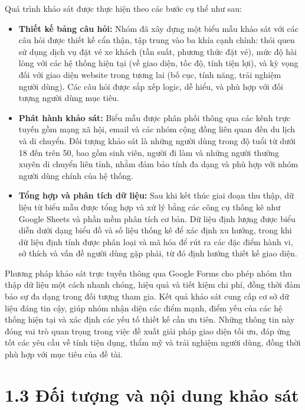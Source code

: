 Quá trình khảo sát được thực hiện theo các bước cụ thể như sau:
\begin{itemize}
    \item \textbf{Thiết kế bảng câu hỏi:} Nhóm đã xây dựng một biểu mẫu khảo sát với các câu hỏi được thiết kế cẩn thận, tập trung vào ba khía cạnh chính: thói quen sử dụng dịch vụ đặt vé xe khách (tần suất, phương thức đặt vé), mức độ hài lòng với các hệ thống hiện tại (về giao diện, tốc độ, tính tiện lợi), và kỳ vọng đối với giao diện website trong tương lai (bố cục, tính năng, trải nghiệm người dùng). Các câu hỏi được sắp xếp logic, dễ hiểu, và phù hợp với đối tượng người dùng mục tiêu.
    \item \textbf{Phát hành khảo sát:} Biểu mẫu được phân phối thông qua các kênh trực tuyến gồm mạng xã hội, email và các nhóm cộng đồng liên quan đến du lịch và di chuyển. Đối tượng khảo sát là những người dùng trong độ tuổi từ dưới 18 đến trên 50, bao gồm sinh viên, người đi làm và những người thường xuyên di chuyển liên tỉnh, nhằm đảm bảo tính đa dạng và phù hợp với nhóm người dùng chính của hệ thống.
    \item \textbf{Tổng hợp và phân tích dữ liệu:} Sau khi kết thúc giai đoạn thu thập, dữ liệu từ biểu mẫu được tổng hợp và xử lý bằng các công cụ thống kê như Google Sheets và phần mềm phân tích cơ bản. Dữ liệu định lượng được biểu diễn dưới dạng biểu đồ và số liệu thống kê để xác định xu hướng, trong khi dữ liệu định tính được phân loại và mã hóa để rút ra các đặc điểm hành vi, sở thích và vấn đề người dùng gặp phải, từ đó định hướng thiết kế giao diện.
\end{itemize}

Phương pháp khảo sát trực tuyến thông qua Google Forms cho phép nhóm thu thập dữ liệu một cách nhanh chóng, hiệu quả và tiết kiệm chi phí, đồng thời đảm bảo sự đa dạng trong đối tượng tham gia. Kết quả khảo sát cung cấp cơ sở dữ liệu đáng tin cậy, giúp nhóm nhận diện các điểm mạnh, điểm yếu của các hệ thống hiện tại và xác định các yếu tố thiết kế cần ưu tiên. Những thông tin này đóng vai trò quan trọng trong việc đề xuất giải pháp giao diện tối ưu, đáp ứng tốt các yêu cầu về tính tiện dụng, thẩm mỹ và trải nghiệm người dùng, đồng thời phù hợp với mục tiêu của đề tài.

\section*{1.3 Đối tượng và nội dung khảo sát}

